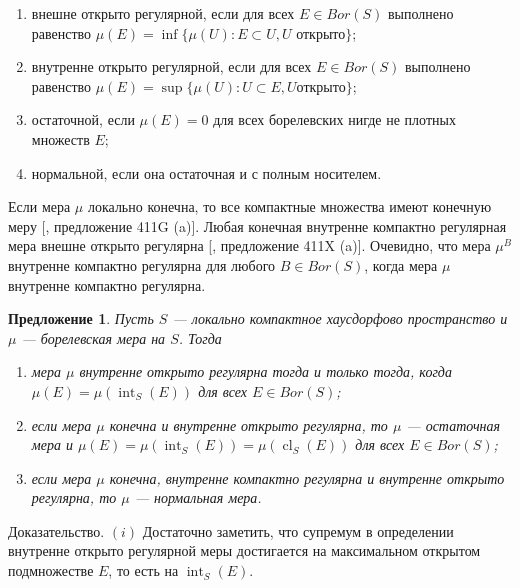 \documentclass[12pt]{article}
\numberwithin{equation}{subsection}
\theoremstyle{plain}
\newtheorem{proposition}{Предложение}
\newenvironment{proof}{Доказательство.}{}
\begin{document}
\begin{fulltext}
\begin{enumerate}[label = (\roman*)]
        \item внешне открыто регулярной, если для всех $E\in Bor(S)$ выполнено
              равенство $\mu(E)=\inf \{\mu(U): E\subset U,U\mbox{ открыто} \}$;

        \item внутренне открыто регулярной, если для всех $E\in Bor(S)$
              выполнено равенство $\mu(E)=\sup \{\mu(U): U\subset E, U\mbox{
                      открыто} \}$;

        \item остаточной, если $\mu(E)=0$ для всех борелевских нигде не плотных
              множеств $E$;

        \item нормальной, если она остаточная и с полным носителем.
    \end{enumerate}

    Если мера $\mu$ локально конечна, то все компактные множества имеют конечную
    меру [\cite{FremMeasTh4.1}, предложение 411G (a)]. Любая конечная внутренне
    компактно регулярная мера внешне открыто регулярна [\cite{FremMeasTh4.1},
    предложение 411X (a)]. Очевидно, что мера $\mu^B$ внутренне компактно
    регулярна для любого $B\in Bor(S)$, когда мера $\mu$ внутренне компактно
    регулярна.

    \begin{proposition}\label{InnerOpenRegMeasCharac} Пусть $S$ --- локально
        компактное хаусдорфово пространство и $\mu$ --- борелевская мера на $S$.
        Тогда

        \begin{enumerate}[label = (\roman*)]
            \item мера $\mu$ внутренне открыто регулярна тогда и только тогда,
                  когда $\mu(E)=\mu(\operatorname{int}_S(E))$ для всех $E\in
                      Bor(S)$;

            \item если мера $\mu$ конечна и внутренне открыто регулярна, то
                  $\mu$ --- остаточная мера и
                  $\mu(E)
                      =\mu(\operatorname{int}_S(E))=\mu(\operatorname{cl}_S(E))$
                  для всех $E\in Bor(S)$;

            \item если мера $\mu$ конечна, внутренне компактно регулярна и
                  внутренне открыто регулярна, то $\mu$ --- нормальная мера.
        \end{enumerate}
    \end{proposition}
    \begin{proof} $(i)$ Достаточно заметить, что супремум в определении
        внутренне открыто регулярной меры достигается на максимальном открытом
        подмножестве $E$, то есть на $\operatorname{int}_S(E)$.


\end{proof}
\end{fulltext}
\end{document}
